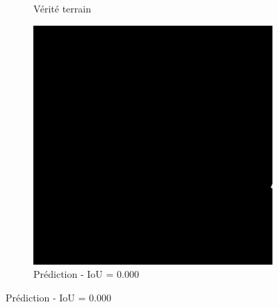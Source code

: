 \begin{figure}[H]
\begin{subfigure}{0.32\textwidth}
    \caption{Vérité terrain}
\end{subfigure}
\hfill
\begin{subfigure}{0.32\textwidth}
    \includegraphics[width=\textwidth]{02-main//figures/ch4/kfold_ensembles/linknet_timm-efficientnet-b5/worst_cases/worst_4_iou0.000_25011125_tile_14_5_cdc6dc_overlay_pred.png}
    \caption{Prédiction - IoU = 0.000}
\end{subfigure}

\vspace{0.35cm}


\end{figure}
